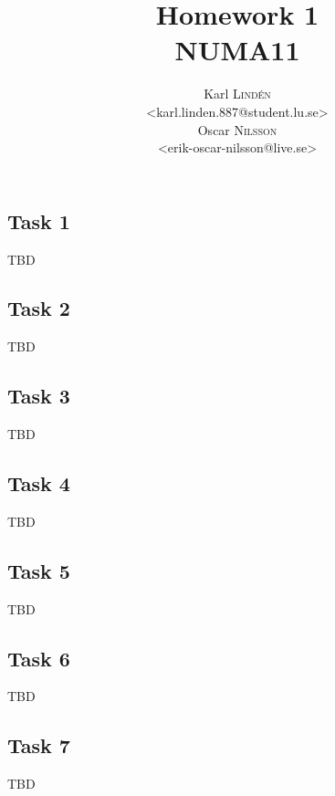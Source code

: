 \documentclass[a4paper,12pt]{article}
\begin{document}
\title{Homework 1 \\ NUMA11}
\author{
  Karl \textsc{Lind\'{e}n} \\
  <karl.linden.887@student.lu.se> \\
  Oscar \textsc{Nilsson} \\
  <erik-oscar-nilsson@live.se>
}

\maketitle
\clearpage

\subsection*{Task 1}

TBD

\subsection*{Task 2}

TBD

\subsection*{Task 3}

TBD

\subsection*{Task 4}

TBD

\subsection*{Task 5}

TBD

\subsection*{Task 6}

TBD

\subsection*{Task 7}

TBD
\end{document}
